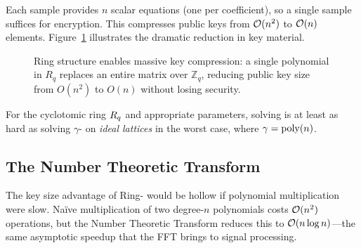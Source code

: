 Each \rlwe{} sample provides $n$ scalar \lwe{} equations (one per coefficient), so a single sample suffices for encryption.  This compresses public keys from $\mathcal{O}(n^2)$ to $\mathcal{O}(n)$ elements.  Figure~\ref{fig:ch07-ring-compression} illustrates the dramatic reduction in key material.

\begin{figure}[t]
\centering
{}
\caption{Ring structure enables massive key compression: a single polynomial in $R_q$ replaces an entire matrix over $\mathbb{Z}_q$, reducing public key size from $O(n^2)$ to $O(n)$ without losing security.}
\label{fig:ch07-ring-compression}
\end{figure}

\begin{theorem}
\label{thm:rlwe-hard}
For the cyclotomic ring $R_q$ and appropriate parameters, solving \rlwe{} is at least as hard as solving $\gamma$-\svp{} on \emph{ideal lattices} in the worst case, where $\gamma = \operatorname{poly}(n)$.
\end{theorem}


\subsection{The Number Theoretic Transform}
\label{subsec:ntt}

The key size advantage of Ring-\lwe{} would be hollow if polynomial multiplication were slow.  Na\"ive multiplication of two degree-$n$ polynomials costs $\mathcal{O}(n^2)$ operations, but the Number Theoretic Transform reduces this to $\mathcal{O}(n \log n)$---the same asymptotic speedup that the FFT brings to signal processing.

